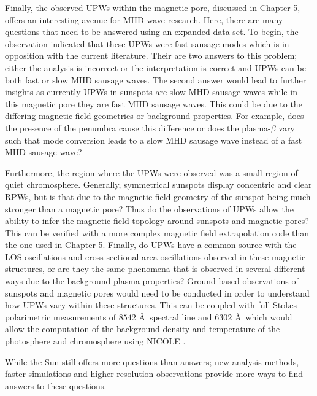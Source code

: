	Finally, the observed UPWs within the magnetic pore, discussed in Chapter 5, offers an interesting avenue for MHD wave research.
	Here, there are many questions that need to be answered using an expanded data set.
	To begin, the observation indicated that these UPWs were fast sausage modes which is in opposition with the current literature.
	Their are two answers to this problem; either the analysis is incorrect or the interpretation is correct and UPWs can be both fast or slow MHD sausage waves.
	The second answer would lead to further insights as currently UPWs in sunspots are slow MHD sausage waves while in this magnetic pore they are fast MHD sausage waves.
	This could be due to the differing magnetic field geometries or background properties.
	For example, does the presence of the penumbra cause this difference or does the plasma-$\beta$ vary such that mode conversion leads to a slow MHD sausage wave instead of a fast MHD sausage wave?
	
	Furthermore, the region where the UPWs were observed was a small region of quiet chromosphere.
	Generally, symmetrical sunspots display concentric and clear RPWs, but is that due to the magnetic field geometry of the sunspot being much stronger than a magnetic pore?
	Thus do the observations of UPWs allow the ability to infer the magnetic field topology around sunspots and magnetic pores?
	This can be verified with a more complex magnetic field extrapolation code than the one used in Chapter 5.
	Finally, do UPWs have a common source with the LOS oscillations and cross-sectional area oscillations observed in these magnetic structures, or are they the same phenomena that is observed in several different ways due to the background plasma properties?
	Ground-based observations of sunspots and magnetic pores would need to be conducted in order to understand how UPWs vary within these structures.
	This can be coupled with full-Stokes polarimetric measurements of  $8542$ \AA\ spectral line and  $6302$ \AA\ which would allow the computation of the background density and temperature of the photosphere and chromosphere using NICOLE \citep{2015A&A...577A...7S,2015ApJ...798..100B}.
	
	While the Sun still offers more questions than answers; new analysis methods, faster simulations and higher resolution observations provide more ways to find answers to these questions.